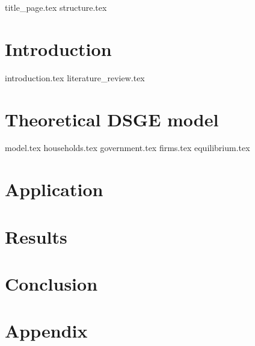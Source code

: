 \documentclass[12pt]{article}
\begin{document}
\begin{sloppypar}
{title_page.tex}
\pagebreak
{structure.tex}
\pagebreak
{}
\section{Introduction}
{introduction.tex}
{literature_review.tex}

\section{Theoretical DSGE model}
{model.tex}
{households.tex}
{government.tex}
{firms.tex}
{equilibrium.tex}
\section{Application} \label{application}
\section{Results}
\section{Conclusion}
\section{Appendix}
\appendix 

\end{sloppypar}
\end{document}
